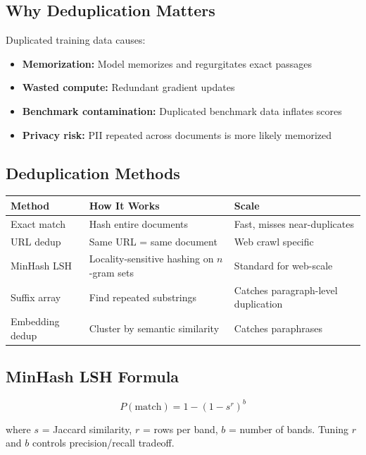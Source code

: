 \documentclass[11pt,a4paper]{article}
\begin{document}
\subsection{Why Deduplication Matters}

Duplicated training data causes:
\begin{itemize}[itemsep=1pt]
  \item \textbf{Memorization:} Model memorizes and regurgitates exact passages
  \item \textbf{Wasted compute:} Redundant gradient updates
  \item \textbf{Benchmark contamination:} Duplicated benchmark data inflates scores
  \item \textbf{Privacy risk:} PII repeated across documents is more likely memorized
\end{itemize}

\subsection{Deduplication Methods}

\begin{center}
\begin{tabular}{lL{4cm}L{5cm}}
\toprule
\textbf{Method} & \textbf{How It Works} & \textbf{Scale} \\
\midrule
Exact match & Hash entire documents & Fast, misses near-duplicates \\
URL dedup & Same URL = same document & Web crawl specific \\
MinHash LSH & Locality-sensitive hashing on $n$-gram sets & Standard for web-scale \\
Suffix array & Find repeated substrings & Catches paragraph-level duplication \\
Embedding dedup & Cluster by semantic similarity & Catches paraphrases \\
\bottomrule
\end{tabular}
\end{center}

\subsection{MinHash LSH Formula}

$$P(\text{match}) = 1 - (1 - s^r)^b$$

where $s$ = Jaccard similarity, $r$ = rows per band, $b$ = number of bands. Tuning $r$ and $b$ controls precision/recall tradeoff.
\end{document}

